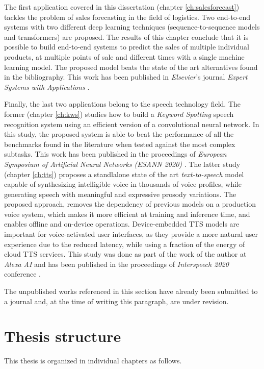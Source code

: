 The first application covered in this dissertation (chapter \ref{ch:salesforecast}) tackles the problem of sales forecasting in the field of logistics. Two end-to-end systems with two different deep learning techniques (sequence-to-sequence models and transformers) are proposed. The results of this chapter conclude that it is possible to build end-to-end systems to predict the sales of multiple individual products, at multiple points of sale and different times with a single machine learning model. The proposed model beats the state of the art alternatives found in the bibliography. This work has been published in \textit{Elsevier}'s journal \textit{Expert Systems with Applications} \autocite{valles2021c}.

Finally, the last two applications belong to the speech technology field. The former (chapter \ref{ch:kws}) studies how to build a \textit{Keyword Spotting} speech recognition system using an efficient version of a convolutional neural network. In this study, the proposed system is able to beat the performance of all the benchmarks found in the literature when tested against the most complex subtasks. This work has been published in the proceedings of \textit{European Symposium of Artificial Neural Networks (ESANN 2020)} \autocite{valles2021a}. The latter study (chapter \ref{ch:tts}) proposes a standlalone state of the art \textit{text-to-speech} model capable of synthesizing intelligible voice in thousands of voice profiles, while generating speech with meaningful and expressive prosody variations. The proposed approach, removes the dependency of previous models on a production voice system, which makes it more efficient at training and inference time, and enables offline and on-device operations. Device-embedded TTS models are important for voice-activated user interfaces, as they provide a more natural user experience due to the reduced latency, while using a fraction of the energy of cloud TTS services. This study was done as part of the work of the author at \textit{Alexa AI} and has been published in the proceedings of \textit{Interspeech 2020} conference \autocite{valles2021b}.

The unpublished works referenced in this section have already been submitted to a journal and, at the time of writing this paragraph, are under revision.

\section{Thesis structure}
This thesis is organized in individual chapters as follows.


